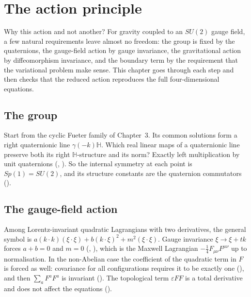 \chapter{The action principle}\label{ch:action}

\begin{questionbox}
Why this action and not another? For gravity coupled to an $SU(2)$ gauge field, a few natural requirements leave almost no freedom: the group is fixed by the quaternions, the gauge-field action by gauge invariance, the gravitational action by diffeomorphism invariance, and the boundary term by the requirement that the variational problem make sense. This chapter goes through each step and then checks that the reduced action reproduces the full four-dimensional equations.
\end{questionbox}

\section{The group}

Start from the cyclic Fueter family of Chapter~3. Its common solutions form a right quaternionic line $\gamma(-k)\mathbb H$. Which real linear maps of a quaternionic line preserve both its right $\mathbb H$-structure and its norm? Exactly left multiplication by unit quaternions (, ). So the internal symmetry at each point is $Sp(1)=SU(2)$, and its structure constants are the quaternion commutators ().

\section{The gauge-field action}

Among Lorentz-invariant quadratic Lagrangians with two derivatives, the general symbol is $a(k\cdot k)(\xi\cdot\xi)+b(k\cdot\xi)^2+m^2(\xi\cdot\xi)$. Gauge invariance $\xi\to\xi+tk$ forces $a+b=0$ and $m=0$ (, ), which is the Maxwell Lagrangian $-\tfrac14F_{\mu\nu}F^{\mu\nu}$ up to normalisation. In the non-Abelian case the coefficient of the quadratic term in $F$ is forced as well: covariance for all configurations requires it to be exactly one (), and then $\sum_aF^aF^a$ is invariant (). The topological term $\varepsilon FF$ is a total derivative and does not affect the equations ().

